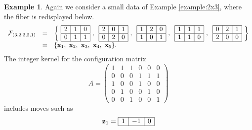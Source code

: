 \documentclass[12pt]{article}
\theoremstyle{definition}
\newtheorem{Example}[Theorem]{Example}
\def\Bx{{\bf x}}
\def\Bz{{\bf z}}
\begin{document}
\begin{Example}
\label{example:2x3-cont2}
Again we consider a small data of Example \ref{example:2x3}, where the
 fiber is redisplayed below.
\[\begin{array}{rcl}
 {\cal F}_{(3,2,2,2,1)} & = & \left\{\ 
\begin{array}{|c|c|c|}\hline
2 & 1 & 0\\ \hline
0 & 1 & 1\\ \hline
\end{array}\ ,
\hspace*{2mm}
\begin{array}{|c|c|c|}\hline
2 & 0 & 1\\ \hline
0 & 2 & 0\\ \hline
\end{array}\ ,
\hspace*{2mm}
\begin{array}{|c|c|c|}\hline
1 & 2 & 0\\ \hline
1 & 0 & 1\\ \hline
\end{array}\ ,
\hspace*{2mm}
\begin{array}{|c|c|c|}\hline
1 & 1 & 1\\ \hline
1 & 1 & 0\\ \hline
\end{array}\ ,
\hspace*{2mm}
\begin{array}{|c|c|c|}\hline
0 & 2 & 1\\ \hline
2 & 0 & 0\\ \hline
\end{array}\ 
\right\}\\
& = & \{\Bx_1,\ \Bx_2,\ \Bx_3,\ \Bx_4,\ \Bx_5\}.
\end{array}
\]
The integer kernel for the configuration matrix
\begin{equation}
 A = \left(\begin{array}{cccccc}
1 & 1 & 1 & 0 & 0 & 0\\
0 & 0 & 0 & 1 & 1 & 1\\
1 & 0 & 0 & 1 & 0 & 0\\
0 & 1 & 0 & 0 & 1 & 0\\
0 & 0 & 1 & 0 & 0 & 1
\end{array}
\right)
\label{eqn:A-2x3-indp}
\end{equation}
includes moves such as
\[
\Bz_1 = \begin{array}{|r|r|r|}\hline
1 & -1 & 0\\ \hline

\end{array}\]
\end{Example}
\end{document}
